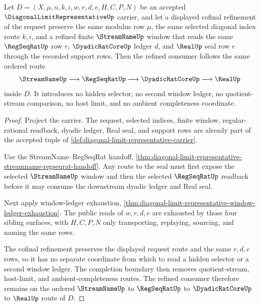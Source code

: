 \begin{theorem}
\label{thm:diagonal-limit-representative-cofinal-window-compatibility}
Let $D=(X,\mu,n,k,i,w,r,d,e,H,C,P,N)$ be an accepted $\DiagonalLimitRepresentativeUp$ carrier, and let a displayed cofinal refinement of the request preserve the same modulus row $\mu$, the same selected diagonal index route $k,i$, and a refined finite $\StreamNameUp$ window that reads the same $\RegSeqRatUp$ row $r$, $\DyadicRatCoreUp$ ledger $d$, and $\RealUp$ seal row $e$ through the recorded support rows. Then the refined consumer follows the same ordered route
$$
\StreamNameUp \longrightarrow \RegSeqRatUp \longrightarrow \DyadicRatCoreUp \longrightarrow \RealUp
$$
inside $D$. It introduces no hidden selector, no second window ledger, no quotient-stream comparison, no host limit, and no ambient completeness coordinate.
\end{theorem}
\begin{proof}
Project the carrier. The request, selected indices, finite window, regular-rational readback, dyadic ledger, Real seal, and support rows are already part of the accepted tuple of \autoref{def:diagonal-limit-representative-carrier}.

Use the StreamName--RegSeqRat handoff, \autoref{thm:diagonal-limit-representative-streamname-regseqrat-handoff}. Any route to the seal must first expose the selected $\StreamNameUp$ window and then the selected $\RegSeqRatUp$ readback before it may consume the downstream dyadic ledger and Real seal.

Next apply window-ledger exhaustion, \autoref{thm:diagonal-limit-representative-window-ledger-exhaustion}. The public reads of $w,r,d,e$ are exhausted by those four sibling surfaces, with $H,C,P,N$ only transporting, replaying, sourcing, and naming the same rows.

The cofinal refinement preserves the displayed request route and the same $r,d,e$ rows, so it has no separate coordinate from which to read a hidden selector or a second window ledger. The completion boundary then removes quotient-stream, host-limit, and ambient-completeness routes. The refined consumer therefore remains on the ordered $\StreamNameUp$ to $\RegSeqRatUp$ to $\DyadicRatCoreUp$ to $\RealUp$ route of $D$.
\end{proof}


